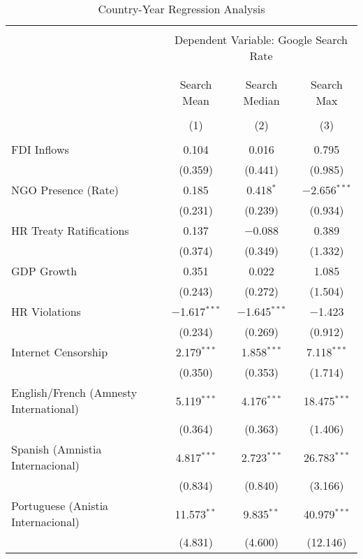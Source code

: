 
\begin{table}[!htbp] \centering 
  \caption{Country-Year Regression Analysis} 
  \label{} 
\begin{tabular}{@{\extracolsep{5pt}}lccc} 
\\[-1.8ex]\hline 
\hline \\[-1.8ex] 
 & \multicolumn{3}{c}{Dependent Variable: Google Search Rate} \\ 
\cline{2-4} 
\\[-1.8ex] & \multicolumn{3}{c}{ } \\ 
 & Search Mean & Search Median & Search Max \\ 
\\[-1.8ex] & (1) & (2) & (3)\\ 
\hline \\[-1.8ex] 
 FDI Inflows & 0.104 & 0.016 & 0.795 \\ 
  & (0.359) & (0.441) & (0.985) \\ 
  NGO Presence (Rate) & 0.185 & 0.418$^{*}$ & $-$2.656$^{***}$ \\ 
  & (0.231) & (0.239) & (0.934) \\ 
  HR Treaty Ratifications & 0.137 & $-$0.088 & 0.389 \\ 
  & (0.374) & (0.349) & (1.332) \\ 
  GDP Growth & 0.351 & 0.022 & 1.085 \\ 
  & (0.243) & (0.272) & (1.504) \\ 
  HR Violations & $-$1.617$^{***}$ & $-$1.645$^{***}$ & $-$1.423 \\ 
  & (0.234) & (0.269) & (0.912) \\ 
  Internet Censorship & 2.179$^{***}$ & 1.858$^{***}$ & 7.118$^{***}$ \\ 
  & (0.350) & (0.353) & (1.714) \\ 
  English/French (Amnesty International) & 5.119$^{***}$ & 4.176$^{***}$ & 18.475$^{***}$ \\ 
  & (0.364) & (0.363) & (1.406) \\ 
  Spanish (Amnistia Internacional) & 4.817$^{***}$ & 2.723$^{***}$ & 26.783$^{***}$ \\ 
  & (0.834) & (0.840) & (3.166) \\ 
  Portuguese (Anistia Internacional) & 11.573$^{**}$ & 9.835$^{**}$ & 40.979$^{***}$ \\ 
  & (4.831) & (4.600) & (12.146) \\ 

\end{tabular}
\end{table}
